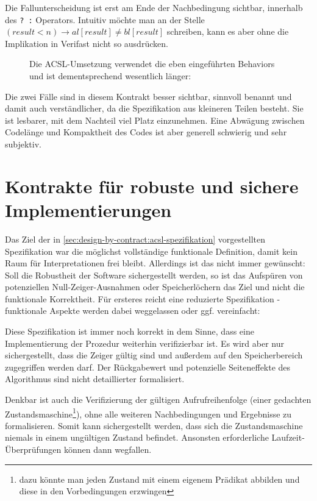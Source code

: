 Die Fallunterscheidung ist erst am Ende der Nachbedingung sichtbar, innerhalb des \lstinline{? :} Operators.
Intuitiv möchte man an der Stelle \((result < n) \rightarrow al[result] \neq  bl[result]\)
schreiben, kann es aber ohne die Implikation in Verifast nicht so ausdrücken.

\begin{figure}[H]
Die ACSL-Umsetzung verwendet die eben eingeführten Behaviors und ist dementsprechend wesentlich länger:

\end{figure}

Die zwei Fälle sind in diesem Kontrakt besser sichtbar, sinnvoll benannt und damit auch verständlicher, 
da die Spezifikation aus kleineren Teilen besteht. Sie ist lesbarer, mit dem Nachteil viel Platz einzunehmen.
Eine Abwägung zwischen Codelänge und Kompaktheit des Codes ist aber generell schwierig und sehr subjektiv.


\section{Kontrakte für robuste und sichere Implementierungen}
\label{sec:design-by-contract:partielle-korrektheit}

Das Ziel der in \ref{sec:design-by-contract:acsl-spezifikation} vorgestellten Spezifikation war die
möglichst vollständige funktionale Definition, damit kein Raum für Interpretationen frei bleibt. Allerdings ist
das nicht immer gewünscht: Soll die Robustheit der Software sichergestellt werden, so ist das Aufspüren 
von potenziellen Null-Zeiger-Ausnahmen oder Speicherlöchern das Ziel und nicht die funktionale
Korrektheit. Für ersteres reicht eine reduzierte Spezifikation - funktionale Aspekte werden dabei 
weggelassen oder ggf. vereinfacht:


 
Diese Spezifikation ist immer noch korrekt in dem Sinne, dass eine Implementierung der Prozedur
weiterhin verifizierbar ist. Es wird aber nur sichergestellt, dass die Zeiger gültig sind und außerdem
auf den Speicherbereich zugegriffen werden darf. Der Rückgabewert und potenzielle Seiteneffekte des 
Algorithmus sind nicht detaillierter formalisiert.

Denkbar ist auch die Verifizierung der gültigen Aufrufreihenfolge (einer gedachten Zustandsmaschine\footnote{dazu
könnte man jeden Zustand mit einem eigenem Prädikat abbilden und diese in den Vorbedingungen erzwingen}),
ohne alle weiteren Nachbedingungen und Ergebnisse zu formalisieren. Somit kann sichergestellt werden,
dass sich die Zustandsmaschine niemals in einem ungültigen Zustand befindet. Ansonsten erforderliche
Laufzeit-Überprüfungen können dann wegfallen.
